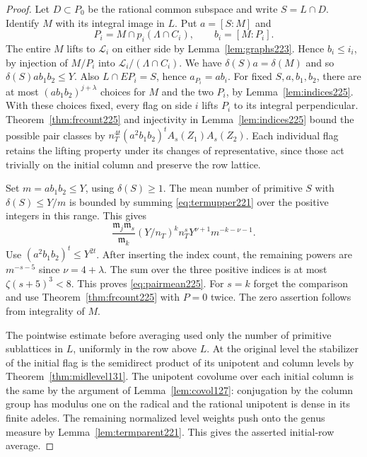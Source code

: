 \documentclass[a4paper,11pt]{article}
\theoremstyle{definition}
\theoremstyle{remark}
\numberwithin{equation}{section}
\begin{document}
\begin{proof}
Let \(D\subset P_0\) be the rational common subspace and
write \(S=L\cap D\). Identify \(M\) with its integral
image in \(L\). Put \(a=[S:M]\) and
\[
     P_i=M\cap p_i(\Lambda\cap C_i),\qquad b_i=[M:P_i].
\]
The entire \(M\) lifts to \(\mathcal L_i\) on either side
by Lemma~\ref{lem:graphs223}. Hence \(b_i\le i_i\), by
injection of \(M/P_i\) into \(\mathcal L_i/(\Lambda\cap C_i)\).
We have \(\delta(S)a=\delta(M)\) and so
\(\delta(S)a b_1 b_2\le Y\). Also \(L\cap EP_i=S\), hence
\(a_{P_i}=a b_i\). For fixed \(S,a,b_1,b_2\), there are
at most \((a b_1 b_2)^{j+\lambda}\) choices for \(M\) and
the two \(P_i\), by Lemma~\ref{lem:indices225}. With these
choices fixed, every flag on side \(i\) lifts \(P_i\) to
its integral perpendicular. Theorem~\ref{thm:frcount225}
and injectivity in Lemma~\ref{lem:indices225} bound the
possible pair classes by
\(n_T^{4t}(a^2b_1b_2)^t A_s(Z_1)A_s(Z_2)\).
Each individual flag retains the lifting property under
its changes of representative, since those act trivially
on the initial column and preserve the row lattice.

Set \(m=a b_1 b_2\le Y\), using \(\delta(S)\ge1\).
The mean number of primitive \(S\) with \(\delta(S)\le Y/m\)
is bounded by summing \eqref{eq:termupper221} over the
positive integers in this range. This gives
\[
 \frac{\mathfrak m_j\mathfrak m_s}{\mathfrak m_k}
          (Y/n_T)^k n_T^s Y^{\nu+1}m^{-k-\nu-1}.
\]
Use \((a^2b_1b_2)^t\le Y^{2t}\). After inserting the
index count, the remaining powers are \(m^{-s-5}\) since
\(\nu=4+\lambda\). The sum over the three positive indices
is at most \(\zeta(s+5)^3<8\). This proves
\eqref{eq:pairmean225}. For \(s=k\) forget the comparison
and use Theorem~\ref{thm:frcount225} with \(P=0\) twice.
The zero assertion follows from integrality of \(M\).

The pointwise estimate before averaging used only the
number of primitive sublattices in \(L\), uniformly in the
row above \(L\). At the original level the stabilizer of
the initial flag is the semidirect product of its unipotent
and column levels by Theorem~\ref{thm:midlevel131}. The
unipotent covolume over each initial column is the same by
the argument of Lemma~\ref{lem:covol127}: conjugation by
the column group has modulus one on the radical and the
rational unipotent is dense in its finite adeles. The
remaining normalized level weights push onto the genus
measure by Lemma~\ref{lem:termparent221}. This gives the
asserted initial-row average.
\end{proof}
\end{document}
